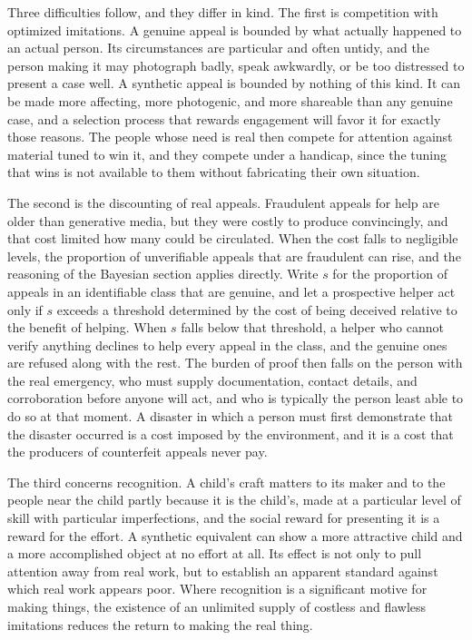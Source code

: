 \documentclass[12pt]{article}
\theoremstyle{plain}
\theoremstyle{definition}
\theoremstyle{remark}
\begin{document}
Three difficulties follow, and they differ in kind. The first is competition with optimized imitations. A genuine appeal is bounded by what actually happened to an actual person. Its circumstances are particular and often untidy, and the person making it may photograph badly, speak awkwardly, or be too distressed to present a case well. A synthetic appeal is bounded by nothing of this kind. It can be made more affecting, more photogenic, and more shareable than any genuine case, and a selection process that rewards engagement will favor it for exactly those reasons. The people whose need is real then compete for attention against material tuned to win it, and they compete under a handicap, since the tuning that wins is not available to them without fabricating their own situation.

The second is the discounting of real appeals. Fraudulent appeals for help are older than generative media, but they were costly to produce convincingly, and that cost limited how many could be circulated. When the cost falls to negligible levels, the proportion of unverifiable appeals that are fraudulent can rise, and the reasoning of the Bayesian section applies directly. Write $s$ for the proportion of appeals in an identifiable class that are genuine, and let a prospective helper act only if $s$ exceeds a threshold determined by the cost of being deceived relative to the benefit of helping. When $s$ falls below that threshold, a helper who cannot verify anything declines to help every appeal in the class, and the genuine ones are refused along with the rest. The burden of proof then falls on the person with the real emergency, who must supply documentation, contact details, and corroboration before anyone will act, and who is typically the person least able to do so at that moment. A disaster in which a person must first demonstrate that the disaster occurred is a cost imposed by the environment, and it is a cost that the producers of counterfeit appeals never pay.

The third concerns recognition. A child's craft matters to its maker and to the people near the child partly because it is the child's, made at a particular level of skill with particular imperfections, and the social reward for presenting it is a reward for the effort. A synthetic equivalent can show a more attractive child and a more accomplished object at no effort at all. Its effect is not only to pull attention away from real work, but to establish an apparent standard against which real work appears poor. Where recognition is a significant motive for making things, the existence of an unlimited supply of costless and flawless imitations reduces the return to making the real thing.
\end{document}
